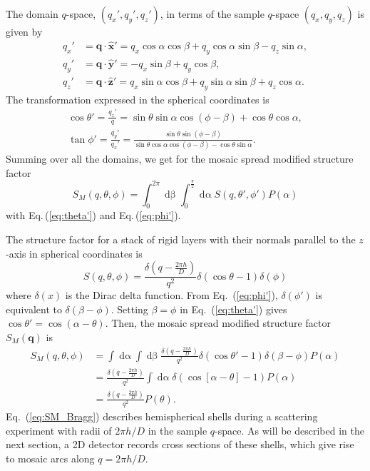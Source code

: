 The domain $q$-space, $(q_x',q_y',q_z')$, in terms of the sample $q$-space 
$(q_x,q_y,q_z)$ is given by
\begin{align}
  q_x' &= \mathbf{q} \cdot \mathbf{\hat{x}'} 
  = q_x\cos\alpha\cos\beta + q_y\cos\alpha\sin\beta -q_z\sin\alpha, 
  \label{eq:qx'} \\
  q_y' &= \mathbf{q} \cdot \mathbf{\hat{y}'} 
  = -q_x\sin\beta + q_y\cos\beta, 
  \label{eq:qy'} \\
  q_z' &= \mathbf{q} \cdot \mathbf{\hat{z}'} 
  = q_x\sin\alpha\cos\beta + q_y\sin\alpha\sin\beta + q_z\cos\alpha.
  \label{eq:qz'}
\end{align}
The transformation expressed in the spherical coordinates is 
\begin{align}
  \cos\theta' = \frac{q_z'}{q} 
              = \sin\theta\sin\alpha\cos(\phi-\beta) + \cos\theta\cos\alpha, 
               \label{eq:theta'}\\
  \tan\phi' 
    = \frac{q_y'}{q_x'}
    = \frac{\sin\theta\sin(\phi-\beta)}{\sin\theta\cos\alpha\cos(\phi-\beta) 
                                       -\cos\theta\sin\alpha}.
  \label{eq:phi'}
\end{align}
Summing over all the domains, we get 
for the mosaic spread modified structure factor
\begin{equation}
  S_M(q,\theta,\phi) = \int_0^{2\pi}\mathop{d\beta} \int_0^{\frac{\pi}{2}} 
  \mathop{d\alpha} S(q,\theta',\phi')P(\alpha)
  \label{eq:SM}
\end{equation}
with Eq.\,(\ref{eq:theta'}) and Eq.\,(\ref{eq:phi'}). 

The structure factor for a stack of rigid layers with their normals parallel
to the $z$-axis in spherical coordinates is
\begin{equation}
  S(q,\theta,\phi) = \frac{\delta(q-\frac{2\pi h}{D})}{q^2} 
  \delta(\cos\theta-1) \delta(\phi)
  \label{eq:Bragg_spherical}
\end{equation}
where $\delta(x)$ is the Dirac delta function. 
From Eq.~(\ref{eq:phi'}), $\delta(\phi')$ is equivalent to
$\delta(\beta-\phi)$. Setting $\beta=\phi$ in Eq.~(\ref{eq:theta'}) gives
$\cos\theta'=\cos(\alpha-\theta)$. 
Then, the mosaic spread modified structure factor $S_M(\mathbf{q})$ is
\begin{align}
  S_M(q,\theta,\phi) &= \int\mathop{d\alpha}\int\mathop{d\beta}
  \frac{\delta(q-\frac{2\pi h}{D})}{q^2} \delta(\cos\theta'-1) \delta(\beta-\phi)P(\alpha) \nonumber\\
  &= \frac{\delta(q-\frac{2\pi h}{D})}{q^2} \int\mathop{d\alpha} \delta(\cos[\alpha-\theta]-1)P(\alpha)\nonumber\\
  &= \frac{\delta(q-\frac{2\pi h}{D})}{q^2}P(\theta).
  \label{eq:SM_Bragg}
\end{align}
Eq.~(\ref{eq:SM_Bragg}) describes hemispherical shells during a scattering
experiment with
radii of $2\pi h/D$ in the sample $q$-space. As will be described
in the next section, a 2D detector records cross sections of these shells,
which give rise to mosaic arcs along $q=2\pi h/D$. 


